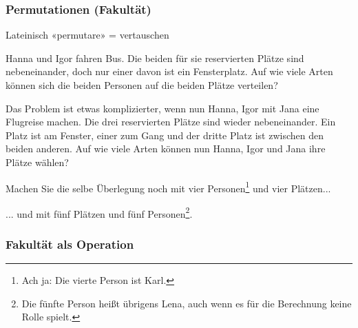\subsubsection{Permutationen (Fakultät)}

Lateinisch «permutare» = vertauschen



Hanna und Igor fahren Bus. Die beiden für sie reservierten Plätze sind
nebeneinander, doch nur einer davon ist ein Fensterplatz. Auf wie
viele Arten können sich die beiden Personen auf die beiden Plätze
verteilen?


Das Problem ist etwas komplizierter, wenn nun Hanna, Igor mit Jana
eine Flugreise machen. Die drei reservierten Plätze sind wieder
nebeneinander. Ein Platz ist am Fenster, einer zum Gang und der dritte
Platz ist zwischen den beiden anderen. Auf wie viele Arten können nun
Hanna, Igor und Jana ihre Plätze wählen?


Machen Sie die selbe Überlegung noch mit vier Personen\footnote{Ach ja: Die vierte Person ist Karl.} und vier
Plätzen...



... und mit fünf Plätzen und fünf Personen\footnote{Die fünfte Person heißt übrigens Lena, auch wenn es für die Berechnung keine Rolle spielt.}.

\newpage


\subsubsection{Fakultät als Operation}

